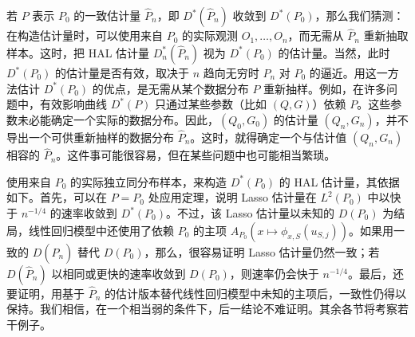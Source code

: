 若 $P$ 表示 $P_0$ 的一致估计量 $\widehat P_n$，即 $D^*(\widehat P_n)$ 收敛到 $D^*(P_0)$，那么我们猜测：在构造估计量时，可以使用来自 $P_0$ 的实际观测 $O_1,\ldots,O_n$，而无需从 $\widehat P_n$ 重新抽取样本。这时，把 HAL 估计量 $D_n^*(\widehat P_n)$ 视为 $D^*(P_0)$ 的估计量。当然，此时 $D^*(P_0)$ 的估计量是否有效，取决于 $n$ 趋向无穷时 $\widehat P_n$ 对 $P_0$ 的逼近。用这一方法估计 $D^*(P_0)$ 的优点，是无需从某个数据分布 $P$ 重新抽样。例如，在许多问题中，有效影响曲线 $D^*(P)$ 只通过某些参数（比如 $(Q,G)$）依赖 $P$。这些参数未必能确定一个实际的数据分布。因此，$(Q_0,G_0)$ 的估计量 $(Q_n,G_n)$，并不导出一个可供重新抽样的数据分布 $\widehat P_n$。这时，就得确定一个与估计值 $(Q_n,G_n)$ 相容的 $\widehat P_n$。这件事可能很容易，但在某些问题中也可能相当繁琐。

\begin{sourcebox}
使用来自 $P_0$ 的实际独立同分布样本，来构造 $D^*(P_0)$ 的 HAL 估计量，其依据如下。首先，可以在 $P=P_0$ 处应用定理，说明 Lasso 估计量在 $L^2(P_0)$ 中以快于 $n^{-1/4}$ 的速率收敛到 $D^*(P_0)$。不过，该 Lasso 估计量以未知的 $D(P_0)$ 为结局，线性回归模型中还使用了依赖 $P_0$ 的主项 $A_{P_0}(x\mapsto\phi_{x,S}(u_{S,j}))$。如果用一致的 $D(\widehat P_n)$ 替代 $D(P_0)$，那么，很容易证明 Lasso 估计量仍然一致；若 $D(\widehat P_n)$ 以相同或更快的速率收敛到 $D(P_0)$，则速率仍会快于 $n^{-1/4}$。最后，还要证明，用基于 $\widehat P_n$ 的估计版本替代线性回归模型中未知的主项后，一致性仍得以保持。我们相信，在一个相当弱的条件下，后一结论不难证明。其余各节将考察若干例子。
\end{sourcebox}
